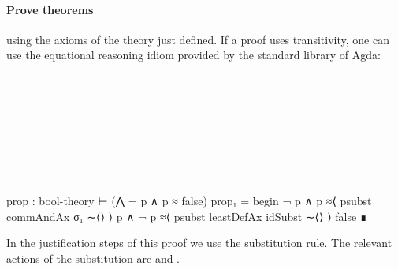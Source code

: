 \paragraph*{Prove theorems}
  using the axioms of the theory just defined.
  If a proof uses transitivity, one can use the equational reasoning
  idiom provided by the standard library of Agda:

  \begin{code}
    \>[2]\AgdaSpace{}%
\AgdaSymbol{:}%
\>[8]\AgdaSpace{}%
\AgdaSpace{}%
\AgdaSymbol{(}\AgdaSpace{}%
\AgdaSpace{}%
\AgdaSpace{}%
\AgdaSpace{}%
\AgdaSpace{}%
\AgdaSpace{}%
\AgdaSymbol{)}\<%
\\
%
\>[2]\AgdaSpace{}%
\AgdaSymbol{=}%
\>[503I]\<%
\\
\>[503I][@{}l@{\AgdaIndent{0}}]%
\>[9]\AgdaSpace{}%
\AgdaSpace{}%
\AgdaSpace{}%
\<%
\\
%
\>[9]\AgdaSpace{}%
\AgdaSpace{}%
\AgdaSpace{}%
\AgdaSpace{}%
\AgdaSpace{}%
\<%
\\
%
\>[9]\AgdaSpace{}%
\AgdaSpace{}%
\AgdaSpace{}%
\<%
\\
%
\>[9]\AgdaSpace{}%
\AgdaSpace{}%
\AgdaSpace{}%
\AgdaSpace{}%
\AgdaSpace{}%
\<%
\\
%
\>[9]\<%
\\
\>[.][@{}l@{}]\<[503I]%
\>[7]\<%
  \end{code}

  \begin{spec}
  prop : bool-theory ⊢ (⋀ ¬ p ∧ p ≈ false)
  prop₁ = begin
         ¬ p ∧ p
         ≈⟨ psubst commAndAx σ₁ ∼⟨⟩ ⟩
         p ∧ ¬ p
         ≈⟨ psubst leastDefAx idSubst ∼⟨⟩ ⟩
         false
       ∎
\end{spec}
\noindent In the justification steps of this proof we use the
substitution rule. The relevant actions of the substitution  are
\AgdaSpace{}\AgdaSpace{}\AgdaSymbol{=}
\AgdaSpace{} and
\AgdaSpace{}\AgdaSpace{}\AgdaSymbol{=}
.



